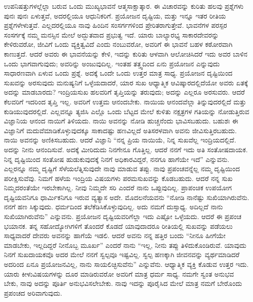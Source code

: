 ಉಪನಿಷತ್ತುಗಳಲ್ಲೆಲ್ಲಾ ಬರುವ ಒಂದು ಮುಖ್ಯಭಾವನೆ ಆತ್ಮಸಾಕ್ಷಾತ್ಕಾರ. ಈ ವಿಚಾರವನ್ನು ಕುರಿತು ಹಲವು ಪ್ರಶ್ನೆಗಳು ಪುನಃ ಪುನಃ ಏಳುತ್ತವೆ, ಅದರಲ್ಲಿಯೂ ಆಧುನಿಕರಿಗೆ. ಪ್ರಯೋಜನ ದೃಷ್ಟಿಯ, ಮತ್ತು ಇನ್ನೂ ಇತರ ರೀತಿಯ ಪ್ರಶ್ನೆಗಳೇಳುತ್ತವೆ. ಎಲ್ಲದರಲ್ಲಿಯೂ ನಾವು ಹಿಂದಿನ ಸಂಸರ್ಗಗಳಿಂದ ಪ್ರೇರಿತರಾಗುತ್ತೇವೆ. ಭಾವನೆಗಳ ಪರಸ್ಪರ ಸಂಸರ್ಗಕ್ಕೆ ನಮ್ಮ ಮನಸ್ಸಿನ ಮೇಲೆ ಅದ್ಭುತವಾದ ಪ್ರಭುತ್ವ ಇದೆ. ಯಾರು ಬಾಲ್ಯಾರಭ್ಯ ಸಾಕಾರದೇವರನ್ನು ಕೇಳಿರುವರೋ, ಜೀವಿಗೆ ಒಂದು ವ್ಯಕ್ತಿತ್ವವಿದೆ ಎಂದು ನಂಬುವರೋ, ಅವರಿಗೆ ಈ ಭಾವನೆ ಬಹಳ ಕಠೋರವಾಗಿ ಕಾಣುತ್ತದೆ. ಆದರೆ ಅವರು ಈ ಭಾವನೆಯನ್ನು ಕೇಳಿ, ಇದನ್ನು ಕುರಿತು ಆಳವಾಗಿ ಆಲೋಚಿಸಿದರೆ ಇದು ಅವರ ಬಾಳಿನ ಒಂದು ಭಾಗವಾಗುವುದು; ಅವರಿನ್ನು ಅಂಜುವುದಿಲ್ಲ. ಇಂತಹ ತತ್ತ್ವದಿಂದ ಏನು ಪ್ರಯೋಜನ ಎನ್ನುವುದು ಸಾಧಾರಣವಾಗಿ ಏಳುವ ಒಂದು ಪ್ರಶ್ನೆ. ಅದಕ್ಕೆ ಒಂದೇ ಒಂದು ಉತ್ತರ ಮಾತ್ರ ಸಾಧ್ಯ. ಪ್ರಯೋಜನ ದೃಷ್ಟಿಯಿಂದ ಸುಖವನ್ನು ಅರಸುವುದು ಮನುಷ್ಯನಿಗೆ ಒಳ್ಳೆಯದಾದರೆ, ಯಾರ ಸುಖ ಆಧ್ಯಾತ್ಮಿಕ ಆವಿಷ್ಕಾರದಲ್ಲಿದೆಯೋ ಅವರು ಏತಕ್ಕೆ ಅದನ್ನು ಮಾಡಬಾರದು? ಇಂದ್ರಿಯಸುಖ ಹಲವರಿಗೆ ತೃಪ್ತಿಯನ್ನು ತರುವುದು; ಅದನ್ನು ಎಲ್ಲರೂ ಅರಸುವರು. ಆದರೆ ಕೆಲವರಿಗೆ ಇದರಿಂದ ತೃಪ್ತಿ ಇಲ್ಲ. ಅವರಿಗೆ ಉತ್ತಮ ಆನಂದಬೇಕು. ನಾಯಿಯ ಆನಂದವೆಲ್ಲಾ ತಿನ್ನುವುದರಲ್ಲಿದೆ ಮತ್ತು ಕುಡಿಯುವುದರಲ್ಲಿದೆ. ಎಲ್ಲವನ್ನೂ ತ್ಯಜಿಸಿ ಎಲ್ಲೊ ಒಂದು ಬೆಟ್ಟದ ಮೇಲೆ ಕುಳಿತು ನಕ್ಷತ್ರಗಳ ಗತಿಯನ್ನು ನೋಡುತ್ತಿರುವ ವಿಜ್ಞಾನಿಯ ಆನಂದ ನಾಯಿಗೆ ತಿಳಿಯದು. ನಾಯಿ ಅವನನ್ನು ನೋಡಿ ಹುಚ್ಚನೆಂದು ಭಾವಿಸಬಹುದು. ಬಹುಶಃ ಈ ವಿಜ್ಞಾನಿಗೆ ಮದುವೆಮಾಡಿಕೊಳ್ಳುವುದಕ್ಕೂ ಸಾಕಾದಷ್ಟು ಹಣವಿಲ್ಲದೆ ಅತಿಸರಳವಾಗಿ ಅವನು ಜೀವಿಸುತ್ತಿರಬಹುದು. ನಾಯಿ ಅವನನ್ನು ಅಣಿಕಿಸಬಹುದು. ಆದರೆ ವಿಜ್ಞಾನಿ “ನನ್ನ ಪ್ರಿಯ ನಾಯಿಯೆ, ನಿನ್ನ ಸುಖವೆಲ್ಲ ಇಂದ್ರಿಯದಲ್ಲಿದೆ. ಅದನ್ನು ನೀನು ಆನಂದಿಸುವೆ. ಅದಕ್ಕೆ ಮೀರಿದುದು ನಿನಗೇನೂ ಗೊತ್ತಿಲ್ಲ. ಆದರೆ ನನಗೆ ಇದು ಅತಿ ಸಂತೋಷದಾಯಕ. ನಿನ್ನ ದೃಷ್ಟಿಯಿಂದ ಸಂತೋಷ ಹುಡುಕುವುದಕ್ಕೆ ನಿನಗೆ ಅಧಿಕಾರವಿದ್ದರೆ, ನನಗೂ ಹಾಗೆಯೇ ಇದೆ” ಎನ್ನುವನು. ಎಲ್ಲರನ್ನೂ ನಮ್ಮ ದೃಷ್ಟಿಗೆ ಸೆಳೆಯಲೆತ್ನಿಸುವುದೇ ನಾವು ಮಾಡುವ ತಪ್ಪು. ನಾವು ಪ್ರಪಂಚವನ್ನೆಲ್ಲ ನಮ್ಮ ದೃಷ್ಟಿಯಿಂದ ಪರೀಕ್ಷಿಸುವೆವು. ನಿಮಗೆ ಹಳೆಯ ಇಂದ್ರಿಯ ವಿಷಯಗಳು ಪರಮಸುಖವನ್ನು ಕೊಡಬಹುದು. ಆದರೆ ನನ್ನ ಸುಖ ನಿಮ್ಮದರಂತೆಯೇ ಇರಬೇಕಾಗಿಲ್ಲ. ನೀವು ನಿಮ್ಮದೇ ಸರಿ ಎಂದರೆ ನಾನು ಒಪ್ಪುವುದಿಲ್ಲ. ಪ್ರಾಪಂಚಿಕ ಉಪಯೋಗ ದೃಷ್ಟಿಯವನಿಗೂ ಧಾರ್ಮಿಕನಿಗೂ ಇರುವ ವ್ಯತ್ಯಾಸ ಅದೇ. ಮೊದಲನೆಯವನು “ನೋಡಿ ನಾನೆಷ್ಟು ಸುಖಿಯಾಗಿರುವೆನು. ನನಗೆ ಹಣ ಸಿಕ್ಕುವುದು. ಧರ್ಮದಿಂದ ತಲೆಕೆಡಿಸಿಕೊಳ್ಳುವುದಿಲ್ಲ. ಅದು ನಮಗೆ ದುಸ್ಸಾಧ್ಯ. ಅದಿಲ್ಲದೆ ನಾನು ಸುಖಿಯಾಗಿರುವೆನು” ಎನ್ನುವನು. ಪ್ರಯೋಜನ ದೃಷ್ಟಿಯವರಿಗೆಲ್ಲಾ ಇದು ಎಷ್ಟೋ ಒಳ್ಳೆಯದು. ಆದರೆ ಈ ಪ್ರಪಂಚ ಭಯಾನಕ. ತನ್ನ ಸಹೋದ್ಯೋಗಿಗಳಿಗೆ ತೊಂದರೆ ಕೊಡದೆ ಯಾವುದಾದರೂ ರೀತಿಯಲ್ಲಿ ಸುಖವನ್ನು ಪಡೆಯಲು ಸಾಧ್ಯವಾದರೆ ದೇವರು ಅವನನ್ನು ಹಾಗೆಯೆ ಇಡಲಿ. ಆದರೆ ಅವನು ನನ್ನ ಹತ್ತಿರ ಬಂದು “ನೀನೂ ಹೀಗೆಯೇ ಮಾಡಬೇಕು, ಇಲ್ಲದಿದ್ದರೆ ನೀನೊಬ್ಬ ಮೂರ್ಖ” ಎಂದರೆ ನಾನು “ಇಲ್ಲ, ನೀನು ತಪ್ಪು ತಿಳಿದುಕೊಂಡಿರುವೆ. ಯಾವುದು ನಿನಗೆ ಸುಖದಾಯಕವೊ ಅದರ ಮೇಲೆ ನನಗೆ ಸ್ವಲ್ಪವೂ ಇಷ್ಟವಿಲ್ಲ. ಸ್ವಲ್ಪ ಹಣಕ್ಕಾಗಿ ಜೀವನವನ್ನು ವ್ಯರ್ಥಮಾಡಿದರೆ ಅದರಿಂದ ಏನೂ ಪ್ರಯೋಜನವಿಲ್ಲ, ನಾನು ಸಾಯಲಿಚ್ಛಿಸುವೆನು” ಎನ್ನುವೆನು. ಆಧ್ಯಾತ್ಮಿಕ ವ್ಯಕ್ತಿ ಕೊಡುವ ಉತ್ತರ ಇದು. ಯಾರು ಕೀಳುವಿಷಯಗಳನ್ನು ದೂರ ಮಾಡಿರುವರೋ ಅವರಿಗೆ ಮಾತ್ರ ಧರ್ಮ ಸಾಧ್ಯ. ನಮಗೇ ಸ್ವಂತ ಅನುಭವ ಬೇಕು, ನಾವು ಅದನ್ನು ಪೂರ್ತಿ ಅನುಭವಿಸಲೇಬೇಕು. ನಾವು ಇದನ್ನು ಪೂರೈಸಿದ ಮೇಲೆ ಮಾತ್ರ ನಮಗೆ ಬೇರೊಂದು ಪ್ರಪಂಚದ ಅರಿವಾಗುವುದು.

